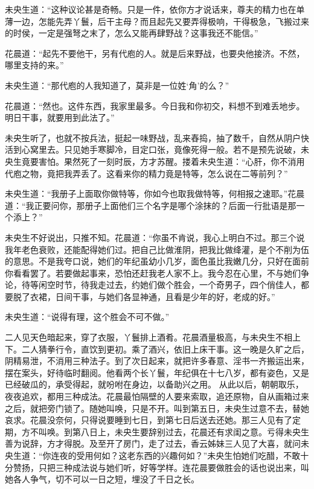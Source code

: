\documentclass[a4paper,12pt,UTF8,twoside]{ctexbook}
\begin{document}
未央生道：“这种议论甚是奇畅。只是一件，依你方才说话来，尊夫的精力也在单薄一边，怎能先弄丫鬟，后干主母？而且起先又要弄得极响，干得极急，飞搬过来的时侯，一定是强弩之末了，怎么又能再肆野战？这事我还不能信。”

花晨道：“起先不要他干，另有代庖的人。就是后来野战，也要央他接济。不然，哪里支持的来。”

未央生道：“那代庖的人我知道了，莫非是一位姓‘角’的么？”

花晨道：“然也。这件东西，我家里最多。今日我和你初交，料想不到难丢地步。明日干事，就要用到此法了。”

未央生听了，也就不按兵法，挺起一味野战，乱来舂捣，抽了数千，自然从阴户快活到心窝里去。只见她手寒脚冷，目定口张，竟像死得一般。若不是预先说破，未央生竟要害怕。果然死了一刻时辰，方才苏醒。搂着未央生道：“心肝，你不消用代庖之物，竟把我弄丢了。这看来你的精力竟是特等，怎么说在二等前列？”

未央生道：“我册子上面取你做特等，你如今也取我做特等，何相报之速耶。”花晨道：“我正要问你，那册子上面他们三个名字是哪个涂抹的？后面一行批语是那一个添上？”

未央生不好说出，只推不知。花晨道：“你虽不肯说，我心上明白不过。那三个说我年老色衰败，还能配得她们过。把自己比做淮阴，把我比做绛灌，是个不削为伍的意思。不是我夸口说，她们的年纪虽幼小几岁，面色虽比我嫩几分，只好在面前你看看罢了。若要做起事来，恐怕还赶我老人家不上。我今忍在心里，不与她们争论，待等闲空时节，待我走过去，约她们做个胜会，一个奇男子，四个俏佳人，都要脱了衣裙，日间干事，与她们各显神通，且看是少年的好，老成的好。”

未央生道：“说得有理，这个胜会不可不做。”

二人见天色暗起来，穿了衣服，丫鬟排上酒肴。花晨酒量极高，与未央生不相上下。二人猜拳行令，直饮到更初。乘了酒兴，依旧上床干事。这一晚是久旷之后，阴精易泄，不消用三种法子。到了次日起来，就把许多春意、淫书一齐搬运出来，摆在案头，好待临时翻阅。他看两个长丫鬟，年纪俱在十七八岁，都有姿色，又是已经破瓜的，承受得起，就吩咐在身边，以备助兴之用。 从此以后，朝朝取乐，夜夜追欢，都用三种成法。花晨最怕隔壁的人要来索取，追还原物，自从画箱过来之后，就把旁门锁了。随她叫唤，只是不开。叫到第五日，未央生过意不去，替她哀求。花晨没奈何，只得说要睡到七日，到第七日后送去还她。那三人见有了定期，方不叫唤。到第八日上，未央生要辞别过去，花晨还有求闺之意。亏得未央生善为说辞，方才得脱。及至开了房门，走了过去，香云姊妹三人见了大喜，就问未央生道：“你连夜的受用何如？这老东西的兴趣何如？”未央生怕她们吃醋，不敢十分赞扬，只把三种成法说与她们听，好等学样。连花晨要做胜会的话也说出来，叫她各人争气，切不可以一日之短，埋没了千日之长。
\end{document}
